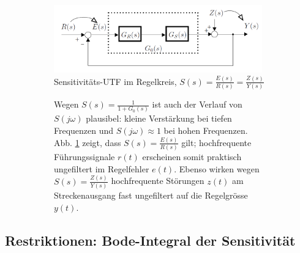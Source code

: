 \begin{figure}[h!]
	\begin{center}
	\begin{subfigure}[b]{9cm}
	\flushleft
			\includegraphics[width=9cm]{./images/SensitivitaetsUTF.png}
\caption{Sensitivitäts-UTF im Regelkreis, $S(s) = \frac{E(s)}{R(s)}=\frac{Z(s)}{Y(s)}$}
			\label{SensitivitaetRegelkreis}
	\end{subfigure}\qquad
	\begin{subfigure}[b]{8cm}
Wegen $S(s) = \frac{1}{1+G_0(s)}$ ist auch der Verlauf von $S(j\omega)$ plausibel: kleine Verstärkung
bei tiefen Frequenzen und $S(j\omega) \approx 1$ bei hohen Frequenzen. Abb. \ref{SensitivitaetRegelkreis} zeigt,
dass $S(s) = \frac{E(s)}{R(s)}$ gilt; hochfrequente Führungssignale $r(t)$ erscheinen somit praktisch
ungefiltert im Regelfehler $e(t)$. Ebenso wirken wegen $S(s) = \frac{Z(s)}{Y(s)}$ hochfrequente Störungen
$z(t)$ am Streckenausgang fast ungefiltert auf die Regelgrösse $y(t)$.

	\end{subfigure}
	\end{center}
\end{figure}



\subsection{Restriktionen: Bode-Integral der Sensitivität}


